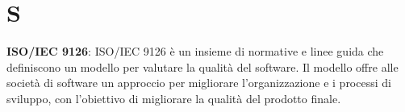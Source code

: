 \section{S}
\textbf{ISO/IEC 9126}: ISO/IEC 9126 è un insieme di normative e linee guida che definiscono un modello per valutare la qualità del software. Il modello offre alle società di software un approccio per migliorare l'organizzazione e i processi di sviluppo, con l'obiettivo di migliorare la qualità del prodotto finale.\\